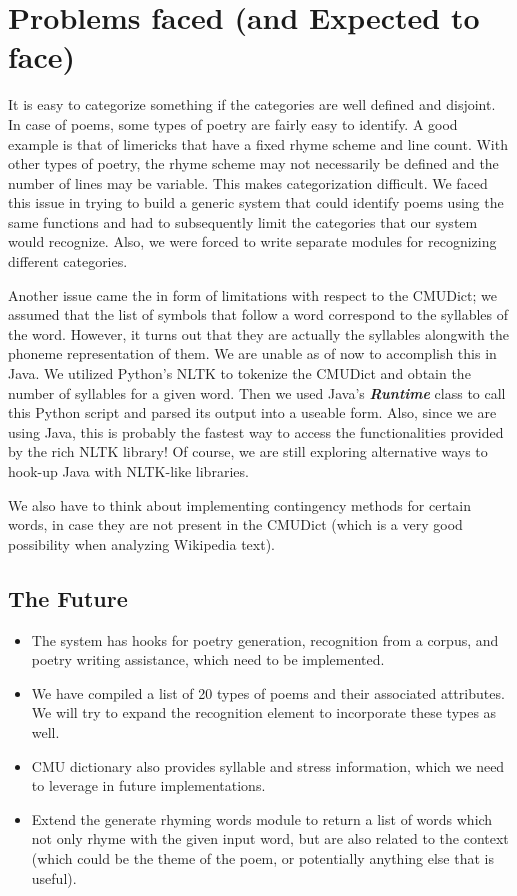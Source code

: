 \documentclass[10pt, letter]{article}
\begin{document}
\section*{Problems faced (and Expected to face)}

It is easy to categorize something if the categories are well defined and disjoint. In case of poems, some types of poetry are fairly easy to identify. A good example is that of limericks that have a fixed rhyme scheme and line count. With other types of poetry, the rhyme scheme may not necessarily be defined and the number of lines may be variable. This makes categorization difficult. We faced this issue in trying to build a generic system that could identify poems using the same functions and had to subsequently limit the categories that our system would recognize. Also, we were forced to write separate modules for recognizing different categories.

Another issue came the in form of limitations with respect to the CMUDict; we assumed that the list of symbols that follow a word correspond to the syllables of the word. However, it turns out that they are actually the syllables alongwith the phoneme representation of them. We are unable as of now to accomplish this in Java. We utilized Python’s NLTK to tokenize the CMUDict and obtain the number of syllables for a given word. Then we used Java’s \textbf{\textit{Runtime}} class to call this Python script and parsed its output into a useable form. Also, since we are using Java, this is probably the fastest way to access the functionalities provided by the rich NLTK library! Of course, we are still exploring alternative ways to hook-up Java with NLTK-like libraries.

We also have to think about implementing contingency methods for certain words, in case they are not present in the CMUDict (which is a very good possibility when analyzing Wikipedia text).

\subsection*{The Future}
\begin{itemize}
    \item The system has hooks for poetry generation, recognition from a corpus, and poetry writing assistance, which need to be implemented.
    \item We have compiled a list of 20 types of poems and their associated attributes. We will try to expand the recognition element to incorporate these types as well.
    \item CMU dictionary also provides syllable and stress information, which we need to leverage in future implementations.
    \item Extend the generate rhyming words module to return a list of words which not only rhyme with the given input word, but are also related to the context (which could be the theme of the poem, or potentially anything else that is useful).
\end{itemize}



\end{document}
